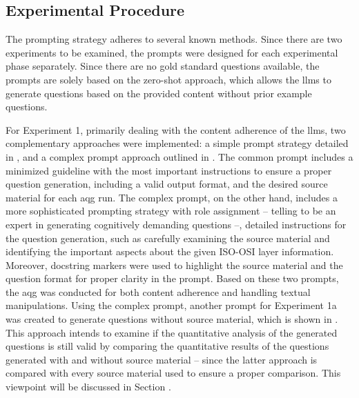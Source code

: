 \subsection{Experimental Procedure}

The prompting strategy adheres to several known methods.
Since there are two experiments to be examined, the prompts were designed for each experimental phase separately. Since there are no gold standard questions available, the prompts are solely based on the zero-shot approach, which allows the \ac{llms} to generate questions based on the provided content without prior example questions.

For Experiment 1, primarily dealing with the content adherence of the \ac{llms}, two complementary approaches were implemented: a simple prompt strategy detailed in , and a complex prompt approach outlined in . The common prompt includes a minimized guideline with the most important instructions to ensure a proper question generation, including a valid output format, and the desired source material for each \ac{aqg} run. The complex prompt, on the other hand, includes a more sophisticated prompting strategy with role assignment -- telling to be an expert in generating cognitively demanding questions --, detailed instructions for the question generation, such as carefully examining the source material and identifying the important aspects about the given ISO-OSI layer information. Moreover, docstring markers were used to highlight the source material and the question format for proper clarity in the prompt. Based on these two prompts, the \ac{aqg} was conducted for both content adherence and handling textual manipulations. Using the complex prompt, another prompt for Experiment 1a was created to generate questions without source material, which is shown in . This approach intends to examine if the quantitative analysis of the generated questions is still valid by comparing the quantitative results of the questions generated with and without source material -- since the latter approach is compared with every source material used to ensure a proper comparison. This viewpoint will be discussed in Section .

